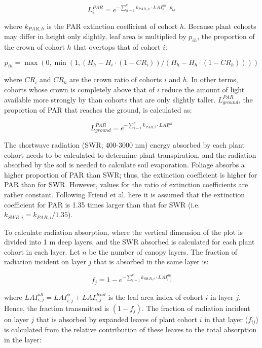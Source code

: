 \documentclass[]{book}
\begin{document}
\begin{equation}
L^{PAR}_i=e^{-\sum_{h=1}^{c}{k_{PAR,h} \cdot LAI_{h}^{all} \cdot p_{ih}}}
\end{equation}

where \(k_{PAR,h}\) is the PAR extinction coefficient of cohort \(h\).
Because plant cohorts may differ in height only slightly, leaf area is
multiplied by \(p_{ih}\), the proportion of the crown of cohort \(h\)
that overtops that of cohort \(i\):

\begin{equation}
p_{ih}=\max(0,\min(1,(H_h-H_i\cdot (1 - CR_i))/(H_h-H_h\cdot (1 - CR_h))))
\end{equation}

where \(CR_i\) and \(CR_h\) are the crown ratio of cohorts \(i\) and
\(h\). In other terms, cohorts whose crown is completely above that of
\(i\) reduce the amount of light available more strongly by than cohorts
that are only slightly taller. \(L^{PAR}_{ground}\), the proportion of
PAR that reaches the ground, is calculated as:

\begin{equation}
L^{PAR}_{ground}=e^{-\sum_{i=1}^{c}{k_{PAR,i} \cdot LAI_{i}^{all}}}
\end{equation}

The shortwave radiation (SWR; 400-3000 nm) energy absorbed by each plant
cohort needs to be calculated to determine plant transpiration, and the
radiation absorbed by the soil is needed to calculate soil evaporation.
Foliage absorbs a higher proportion of PAR than SWR; thus, the
extinction coefficient is higher for PAR than for SWR. However, values
for the ratio of extinction coefficients are rather constant. Following
Friend et al. \citeyearpar{Friend1997} here it is assumed that the
extinction coefficient for PAR is 1.35 times larger than that for SWR
(i.e. \(k_{SWR,i} = k_{PAR,i}/1.35\)).

To calculate radiation absorption, where the vertical dimension of the
plot is divided into 1 m deep layers, and the SWR absorbed is calculated
for each plant cohort in each layer. Let \(n\) be the number of canopy
layers. The fraction of radiation incident on layer \(j\) that is
absorbed in the same layer is:

\begin{equation}
f_j=1 - e^{-\sum_{i=1}^{c}{k_{SWR,i} \cdot LAI_{i,j}^{all}}}
\end{equation}

where \(LAI_{i,j}^{all} = LAI_{i,j}^{\phi}+LAI_{i,j}^{dead}\) is the
leaf area index of cohort \(i\) in layer \(j\). Hence, the fraction
transmitted is \((1-f_j)\). The fraction of radiation incident on layer
\(j\) that is absorbed by expanded leaves of plant cohort \(i\) in that
layer (\(f_{ij}\)) is calculated from the relative contribution of these
leaves to the total absorption in the layer:
\end{document}
